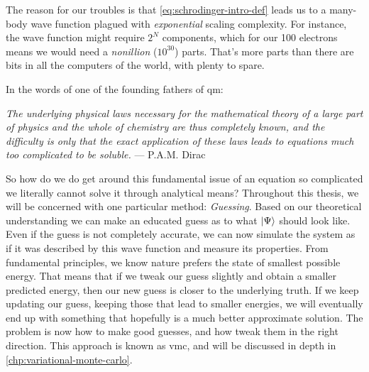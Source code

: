 \documentclass[Thesis.tex]{subfiles}
\begin{document}
The reason for our troubles is that \cref{eq:schrodinger-intro-def} leads us to
a many-body wave function plagued with \emph{exponential} scaling complexity.
For instance, the wave function might require $2^N$ components, which for our
100 electrons means we would need a \emph{nonillion} ($10^{30}$) parts. That's
more parts than there are bits in all the computers of the world, with plenty to
spare.

\begin{comment}
In most other areas of science we have been able to tame the mathematical
challenges through sophisticated high-performance computational frameworks.
Scaling complexities of $N^2$, $N^3$ or similar can usually be overcome by
simply using bigger and better computers, all the way to supercomputers with
hundreds of thousands of cores. But exponential scaling - that becomes
infeasible quickly.
\end{comment}

In the words of one of the founding fathers of \acrshort{qm}:
\begin{displayquote}
\emph{The underlying physical laws necessary for the mathematical theory of a large
part of physics and the whole of chemistry are thus completely known, and the
difficulty is only that the exact application of these laws leads to equations
much too complicated to be soluble.} --- P.A.M. Dirac
\end{displayquote}


So how do we do get around this fundamental issue of an equation so complicated
we literally cannot solve it through analytical means? Throughout this thesis,
we will be concerned with one particular method: \emph{Guessing}. Based on our
theoretical understanding we can make an educated guess as to what $| \Psi \rangle$
should look like. Even if the guess is not completely accurate, we can now
simulate the system as if it was described by this wave function and measure its
properties. From fundamental principles, we know nature prefers the state of
smallest possible energy. That means that if we tweak our guess slightly and
obtain a smaller predicted energy, then our new guess is closer to the
underlying truth. If we keep updating our guess, keeping those that lead to
smaller energies, we will eventually end up with something that hopefully is a
much better approximate solution. The problem is now how to make good guesses,
and how tweak them in the right direction. This approach is known as \gls{vmc},
and will be discussed in depth in \cref{chp:variational-monte-carlo}.\\
\end{document}
